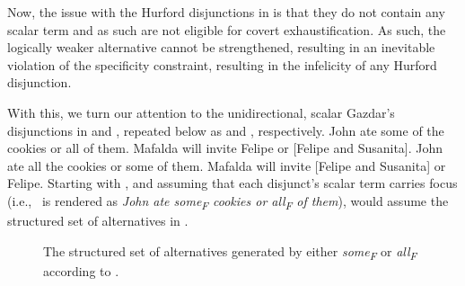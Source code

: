 Now, the issue with the Hurford disjunctions in  is that they do not contain any scalar term and as such are not eligible for covert exhaustification. As such, the logically weaker alternative cannot be strengthened, resulting in an inevitable violation of the specificity constraint, resulting in the infelicity of any Hurford disjunction.

With this, we turn our attention to the unidirectional, scalar Gazdar's disjunctions in  and , repeated below as  and , respectively.
\pex[nopreamble=true]\label{ex:scalardisjunction-good-repeat1}%
\a{} John ate some of the cookies or all of them.
\a{} Mafalda will invite Felipe or [Felipe and Susanita].
\xe
\pex[nopreamble=true]\label{ex:scalardisjunction-bad-repeat1}%
\a{}\ljudge{\#}John ate all the cookies or some of them.
\a{}\ljudge{\#}Mafalda will invite [Felipe and Susanita] or Felipe.
\xe
Starting with ,  and assuming that each disjunct's scalar term carries focus (i.e.,~ is rendered as \textit{John ate some\textsubscript{F} cookies or all\textsubscript{F} of them}), \textcite{Ippolito2020} would assume the structured set of alternatives in .
\begin{figure}[!htb]
    \centering\hspace{-6cm}
    
    \caption{The structured set of alternatives generated by either \textit{some\textsubscript{F}} or \textit{all\textsubscript{F}} according to \textcite{Ippolito2020}.}
\end{figure}
